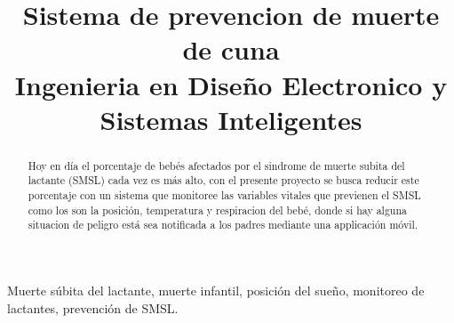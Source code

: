 \title{
    Sistema de prevencion de muerte de cuna\\
    \small{Ingenieria en Diseño Electronico y Sistemas Inteligentes}
}
\author{
    \and
    \and
}
\maketitle

%
%
\begin{abstract}

    Hoy en día el porcentaje de bebés afectados por el sindrome de muerte subita del lactante (SMSL) cada vez es más alto,
    con el presente proyecto se busca reducir este porcentaje con un sistema que monitoree las variables vitales que previenen el SMSL como los son la posición, temperatura y respiracion del bebé,
    donde si hay alguna situacion de peligro está sea notificada a los padres mediante una applicación móvil.


\end{abstract}
\begin{IEEEkeywords}
    Muerte súbita del lactante, muerte infantil, posición del sueño, monitoreo de lactantes, prevención de SMSL.
\end{IEEEkeywords}

\tableofcontents

